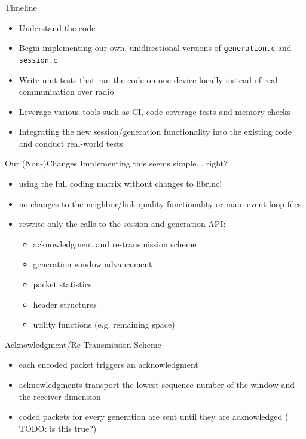 \documentclass[11pt]{beamer}
\begin{document}
	\begin{frame}{Timeline}
		\begin{itemize}
			\item Understand the code
			\item Begin implementing our own, unidirectional versions of \texttt{generation.c} and \texttt{session.c}
			\item Write unit tests that run the code on one device locally instead of real communication over radio
			\item Leverage various tools such as CI, code coverage tests and memory checks
			\item Integrating the new session/generation functionality into the existing code and conduct real-world tests
		\end{itemize}
	\end{frame}

	\begin{frame}{Our (Non-)Changes}
		Implementing this seems simple... right?
		\begin{itemize}
			\item using the full coding matrix without changes to librlnc!
			\item no changes to the neighbor/link quality functionality or main event loop files
			\item rewrite only the calls to the session and generation API:
			\begin{itemize}
				\item acknowledgment and re-transmission scheme
				\item generation window advancement
				\item packet statistics
				\item header structures
				\item utility functions (e.g. remaining space)
			\end{itemize}
		\end{itemize}
	\end{frame}

	\begin{frame}{Acknowledgment/Re-Transmission Scheme}
		\begin{itemize}
			\item each encoded packet triggers an acknowledgment
			\item acknowledgments transport the lowest sequence number of the window and the receiver dimension
			\item coded packets for every generation are sent until they are acknowledged (\color{red} TODO: is this true?)
		\end{itemize}
	\end{frame}
\end{document}
